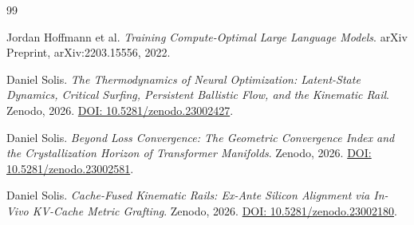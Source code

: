 \documentclass[11pt]{article}
\begin{document}
\begin{thebibliography}{99}

Jordan Hoffmann et al. \textit{Training Compute-Optimal Large Language Models}. arXiv Preprint, arXiv:2203.15556, 2022.

Daniel Solis. \textit{The Thermodynamics of Neural Optimization: Latent-State Dynamics, Critical Surfing, Persistent Ballistic Flow, and the Kinematic Rail}. Zenodo, 2026. \href{https://doi.org/10.5281/zenodo.23002427}{DOI: 10.5281/zenodo.23002427}.

Daniel Solis. \textit{Beyond Loss Convergence: The Geometric Convergence Index and the Crystallization Horizon of Transformer Manifolds}. Zenodo, 2026. \href{https://doi.org/10.5281/zenodo.23002581}{DOI: 10.5281/zenodo.23002581}.

Daniel Solis. \textit{Cache-Fused Kinematic Rails: Ex-Ante Silicon Alignment via In-Vivo KV-Cache Metric Grafting}. Zenodo, 2026. \href{https://doi.org/10.5281/zenodo.23002180}{DOI: 10.5281/zenodo.23002180}.

\end{thebibliography}
\end{document}
